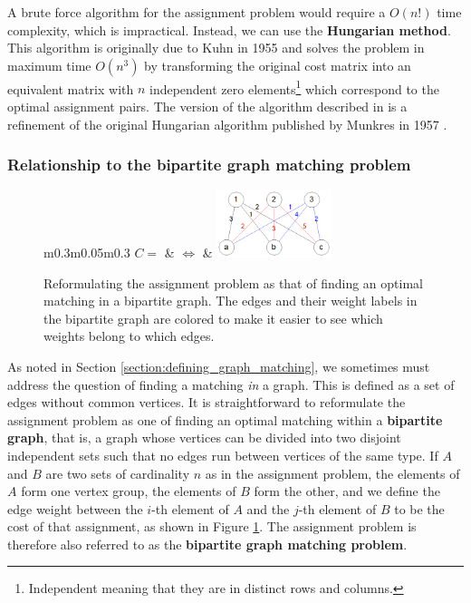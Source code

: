 \documentclass[12pt]{thesis}
\theoremstyle{plain}
\theoremstyle{definition}
\theoremstyle{remark}
\begin{document}
A brute force algorithm for the assignment problem would require a $O(n!)$ time complexity, which is impractical. Instead, we can use the \textbf{Hungarian method}. This algorithm is originally due to Kuhn in 1955 \cite{Kuhn_1955} and solves the problem in maximum time $O(n^3)$ by transforming the original cost matrix into an equivalent matrix with $n$ independent zero elements\footnote{Independent meaning that they are in distinct rows and columns.} which correspond to the optimal assignment pairs. The version of the algorithm described in \cite{Riesen_2009} is a refinement of the original Hungarian algorithm published by Munkres in 1957 \cite{munkres1957algorithms}.

\subsubsection{Relationship to the bipartite graph matching problem}

\begin{figure}[!t]
\centering
\begin{tabular}{m{}m{}m{}}
$C = $
 & $\Leftrightarrow$ &
\includegraphics[width=0.3\textwidth]{bipartite_assignment_problem.png} \\
\end{tabular}
\caption{Reformulating the assignment problem as that of finding an optimal matching in a bipartite graph. The edges and their weight labels in the bipartite graph are colored to make it easier to see which weights belong to which edges.}
\label{bipartite_reformulation}
\end{figure}

As noted in Section \ref{section:defining_graph_matching}, we sometimes must address the question of finding a matching \textit{in} a graph. This is defined as a set of edges without common vertices. It is straightforward to reformulate the assignment problem as one of finding an optimal matching within a \textbf{bipartite graph}, that is, a graph whose vertices can be divided into two disjoint independent sets such that no edges run between vertices of the same type. If $A$ and $B$ are two sets of cardinality $n$ as in the assignment problem, the elements of $A$ form one vertex group, the elements of $B$ form the other, and we define the edge weight between the $i$-th element of $A$ and the $j$-th element of $B$ to be the cost of that assignment, as shown in Figure \ref{bipartite_reformulation}. The assignment problem is therefore also referred to as the \textbf{bipartite graph matching problem}.
\end{document}
